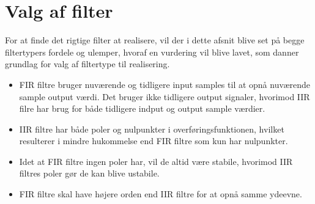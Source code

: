 \section{Valg af filter}\label{sec:dec_filter}
For at finde det rigtige filter at realisere, vil der i dette afsnit blive set på begge filtertypers fordele og ulemper, hvoraf en vurdering vil blive lavet, som danner grundlag for valg af filtertype til realisering.

\begin{itemize}
	\item FIR filtre bruger nuværende og tidligere input samples til at opnå nuværende sample output værdi. Det bruger ikke tidligere output signaler, hvorimod IIR filre har brug for både tidligere indput og output sample værdier.
	\item IIR filtre har både poler og nulpunkter i overføringsfunktionen, hvilket resulterer i mindre hukommelse end FIR filtre som kun har nulpunkter.
	\item Idet at FIR filtre ingen poler har, vil de altid være stabile, hvorimod IIR filtres poler gør de kan blive ustabile.
	\item FIR filtre skal have højere orden end IIR filtre for at opnå samme ydeevne.
\end{itemize}


